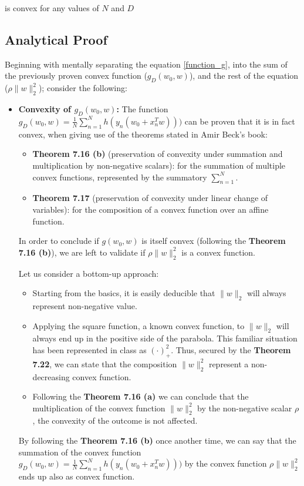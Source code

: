 \documentclass[a4paper,12pt]{report}
\begin{document}
is convex for any values of $N$ and $D$

\subsection{Analytical Proof}

Beginning with mentally separating the equation \eqref{function_g}, into the sum of the previously proven convex function ($g_D(w_0, w)$), and the rest of the equation ($\rho \|w\|_2^2$); consider the following:

\begin{itemize}
    \item \textbf{Convexity of $g_D(w_0,w)$:} The function \(g_D(w_0, w) = \frac{1}{N} \sum_{n=1}^{N} h(y_n(w_0 + x_n^T w)))\) can be proven that it is in fact convex, when giving use of the theorems stated in Amir Beck's book:
    \begin{itemize}
        \item \textbf{Theorem 7.16 (b)} (preservation of convexity under summation and multiplication by non-negative scalars): for the summation of multiple convex functions, represented by the summatory $\sum_{n=1}^{N}$.
        \item \textbf{Theorem 7.17} (preservation of convexity under linear change of variables): for the composition of a convex function over an affine function.
    \end{itemize}

    In order to conclude if $g(w_0,w)$ is itself convex (following the \textbf{Theorem 7.16 (b)}), we are left to validate if $\rho \|w\|_2^2$ is a convex function.

    Let us consider a bottom-up approach:
    \begin{itemize}
        \item Starting from the basics, it is easily deducible that $\|w\|_2$ will always represent non-negative value.
        \item Applying the square function, a known convex function, to $\|w\|_2$ will always end up in the positive side of the parabola. This familiar situation has been represented in class as $(\cdot)_+^2$. Thus, secured by the \textbf{Theorem 7.22}, we can state that the composition $\|w\|_2^2$ represent a non-decreasing convex function.
        \item Following the \textbf{Theorem 7.16 (a)} we can conclude that the multiplication of the convex function $\|w\|_2^2$ by the non-negative scalar $\rho$, the convexity of the outcome is not affected.
    \end{itemize}

    By following the \textbf{Theorem 7.16 (b)} once another time, we can say that the summation of the convex function \(g_D(w_0, w) = \frac{1}{N} \sum_{n=1}^{N} h(y_n(w_0 + x_n^T w)))\) by the convex function $\rho \|w\|_2^2$ ends up also as convex function.
\end{itemize}
\end{document}
